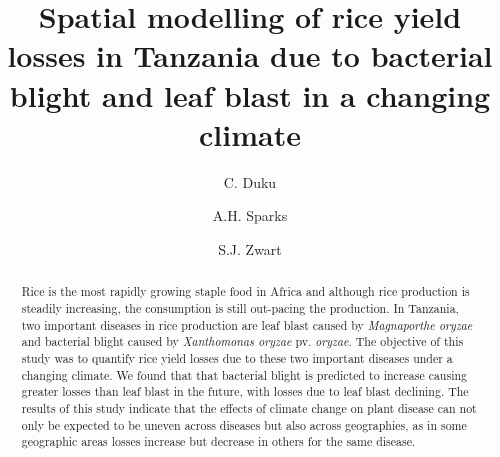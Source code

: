 \documentclass[preprint,review,12pt]{elsarticle}
\begin{document}
    
    
    \begin{frontmatter}
    
    
    
    \title{Spatial modelling of rice yield losses in Tanzania due to bacterial blight and leaf blast in a changing climate} 
    
    
    \author[AfricaRice]{C. Duku}
    \author[IRRI]{A.H. Sparks}
    \author[AfricaRice]{S.J. Zwart}
    
    
    \address[AfricaRice]{Africa Rice Center (AfricaRice), 01 BP 2031, Cotonou, Benin}
    \address[IRRI]{International Rice Research Institute (IRRI), DAPO Box 7777, Metro Manila, 1301, Philippines}
    
    \begin{abstract}
    Rice is the most rapidly growing staple food in Africa and although rice production is steadily increasing, the consumption is still out-pacing the production. In Tanzania, two important diseases in rice production are leaf blast caused by \textit{Magnaporthe oryzae} and bacterial blight caused by \textit{Xanthomonas oryzae} pv. \textit{oryzae}. The objective of this study was to quantify rice yield losses due to these two important diseases under a changing climate. We found that that bacterial blight is predicted to increase causing greater losses than leaf blast in the future, with losses due to leaf blast declining. The results of this study indicate that the effects of climate change on plant disease can not only be expected to be uneven across diseases but also across geographies, as in some geographic areas losses increase but decrease in others for the same disease.
    \end{abstract}
    

\end{frontmatter}
\end{document}
